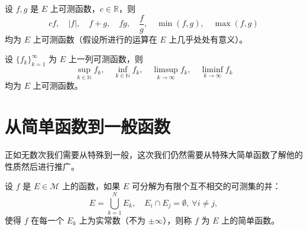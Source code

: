 \documentclass[lang=cn,10pt]{elegantbook}
\let\oldliminf\liminf
\renewcommand{\liminf}{\mathop{\oldliminf}\limits}
\let\oldlimsup\limsup
\renewcommand{\limsup}{\mathop{\oldlimsup}\limits}
\begin{document}
\begin{theorem}[函数可测性对算术运算的封闭性]
设 $f, g$ 是 $E$ 上可测函数，$c \in \mathbb{R}$，则
\[
cf,\quad |f|,\quad f + g,\quad fg,\quad \frac{f}{g},\quad \min(f, g),\quad \max(f, g)
\]
均为 $E$ 上可测函数（假设所进行的运算在 $E$ 上几乎处处有意义）。
\end{theorem}
\begin{theorem}[函数可测性对极限运算的封闭性]
设 $\{f_k\}_{k=1}^\infty$ 为 $E$ 上一列可测函数，则
\[
\sup_{k \in \mathbb{N}} f_k,\quad \inf_{k \in \mathbb{N}} f_k,\quad \limsup_{k \to \infty} f_k,\quad \liminf_{k \to \infty} f_k
\]
均为 $E$ 上可测函数。
\end{theorem}
\section{从简单函数到一般函数}
正如无数次我们需要从特殊到一般，这次我们仍然需要从特殊大简单函数了解他的性质然后进行推广。
\begin{definition}[简单函数]
设 $f$ 是 $E \in \mathcal{M}$ 上的函数，如果 $E$ 可分解为有限个互不相交的可测集的并：
\[
E = \bigcup_{k=1}^{N} E_k, \quad E_i \cap E_j = \emptyset, \ \forall i \ne j,
\]
使得 $f$ 在每一个 $E_k$ 上为实常数（不为 $\pm \infty$），则称 $f$ 为 $E$ 上的简单函数。
\end{definition}
\end{document}
